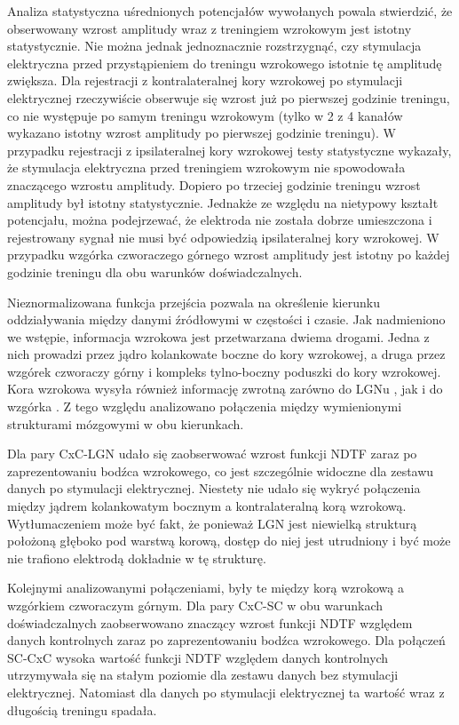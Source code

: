 \documentclass{pracamgr_2}
\begin{document}
	Analiza statystyczna uśrednionych potencjałów wywołanych powala stwierdzić, że obserwowany wzrost amplitudy wraz z treningiem wzrokowym jest istotny statystycznie. Nie można jednak jednoznacznie rozstrzygnąć, czy stymulacja elektryczna przed przystąpieniem do treningu wzrokowego istotnie tę amplitudę zwiększa. Dla rejestracji z kontralateralnej kory wzrokowej po stymulacji elektrycznej rzeczywiście obserwuje się wzrost już po pierwszej godzinie treningu, co nie występuje po samym treningu wzrokowym (tylko w 2 z 4 kanałów wykazano istotny wzrost amplitudy po pierwszej godzinie treningu). W przypadku rejestracji z ipsilateralnej kory wzrokowej testy statystyczne wykazały, że stymulacja elektryczna przed treningiem wzrokowym nie spowodowała znaczącego wzrostu amplitudy. Dopiero po trzeciej godzinie treningu wzrost amplitudy był istotny statystycznie. Jednakże ze względu na nietypowy kształt potencjału, można podejrzewać, że elektroda nie została dobrze umieszczona i rejestrowany sygnał nie musi być odpowiedzią ipsilateralnej kory wzrokowej. W przypadku wzgórka czworaczego górnego wzrost amplitudy jest istotny po każdej godzinie treningu dla obu warunków doświadczalnych.
	
	Nieznormalizowana funkcja przejścia pozwala na określenie kierunku oddziaływania między danymi źródłowymi w częstości i czasie. Jak nadmieniono we wstępie, informacja wzrokowa jest przetwarzana dwiema drogami. Jedna z nich prowadzi przez jądro kolankowate boczne do kory wzrokowej, a druga przez wzgórek czworaczy górny i kompleks tylno-boczny poduszki do kory wzrokowej. Kora wzrokowa wysyła również informację zwrotną zarówno do LGNu \citep{viola2}, jak i do wzgórka \citep{viola}. Z tego względu analizowano połączenia między wymienionymi strukturami mózgowymi w obu kierunkach.
	
	Dla pary CxC-LGN udało się zaobserwować wzrost funkcji NDTF zaraz po zaprezentowaniu bodźca wzrokowego, co jest szczególnie widoczne dla zestawu danych po stymulacji elektrycznej. Niestety nie udało się wykryć połączenia między jądrem kolankowatym bocznym a kontralateralną korą wzrokową. Wytłumaczeniem może być fakt, że ponieważ LGN jest niewielką strukturą położoną głęboko pod warstwą korową, dostęp do niej jest utrudniony i być może nie trafiono elektrodą dokładnie w tę strukturę.
	
	Kolejnymi analizowanymi połączeniami, były te między korą wzrokową a wzgórkiem czworaczym górnym. Dla pary CxC-SC w obu warunkach doświadczalnych zaobserwowano znaczący wzrost funkcji NDTF względem danych kontrolnych zaraz po zaprezentowaniu bodźca wzrokowego. Dla połączeń SC-CxC wysoka wartość funkcji NDTF względem danych kontrolnych utrzymywała się na stałym poziomie dla zestawu danych bez stymulacji elektrycznej. Natomiast dla danych po stymulacji elektrycznej ta wartość wraz z długością treningu spadała.
	
\end{document}

